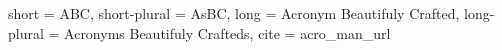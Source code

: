 
{
  short = ABC,
  short-plural = AsBC,
  long = Acronym Beautifuly Crafted,
  long-plural = Acronyms Beautifuly Crafteds,
  cite = {acro_man_url}
}




